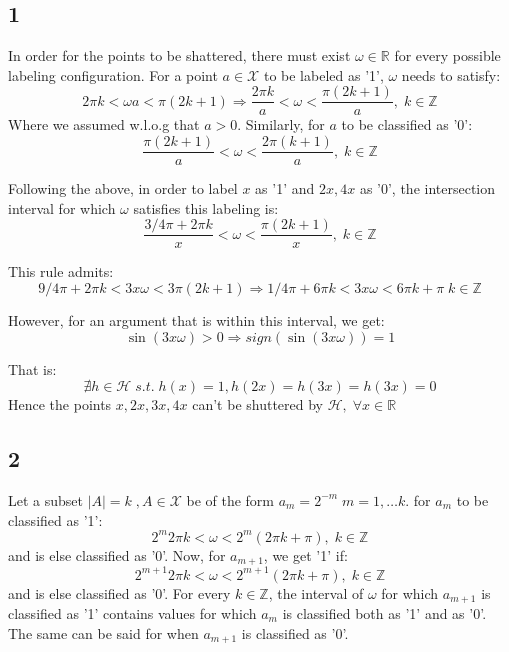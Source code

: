 \subsection*{1}
In order for the points to be shattered, there must exist $\omega \in \mathbb{R}$ for every possible labeling configuration.
For a point $a \in \mathcal{X}$ to be labeled as '1', $\omega$ needs to satisfy:
\begin{equation*}
    2 \pi k < \omega a < \pi (2k + 1) \Rightarrow \frac{2 \pi k}{a} < \omega < \frac{\pi (2k + 1)}{a},  \; k\in \mathbb{Z}
\end{equation*}
Where we assumed w.l.o.g that $a>0$. Similarly, for $a$ to be classified as '0':
\begin{equation*}
    \frac{\pi(2k+1)}{a} < \omega < \frac{2\pi(k + 1)}{a},  \; k\in \mathbb{Z}
\end{equation*}

Following the above, in order to label $x$ as '1' and $2x, 4x$ as '0', the intersection interval for which $\omega$ satisfies this labeling is:
\begin{equation*}
    \frac{3/4 \pi + 2 \pi k}{x} < \omega < \frac{\pi (2k + 1)}{x},  \; k\in \mathbb{Z}
\end{equation*}

This rule admits:
\begin{equation*}
    9/4 \pi + 2 \pi k < 3x \omega  < 3\pi (2k + 1) \Rightarrow
    1/4 \pi + 6 \pi k < 3x \omega  < 6\pi k + \pi \; k\in \mathbb{Z}
\end{equation*}

However, for an argument that is within this interval, we get:
\begin{equation*}
    \sin(3x\omega) > 0 \Rightarrow sign(\sin(3x\omega)) = 1
\end{equation*}

That is:
\begin{equation*}
    \nexists h\in \mathcal{H} \; s.t. \; h(x)=1, h(2x)=h(3x)=h(3x)=0
\end{equation*}
Hence the points $x, 2x, 3x, 4x$ can't be shuttered by $\mathcal{H}, \; \forall x\in \mathbb{R}$

\subsection*{2}
Let a subset $|A|=k \;, A\in \mathcal{X}$ be of the form $a_m = 2^{-m} \; m=1,\dotsc k$.
for $a_m$ to be classified as '1':
\begin{equation*}
   2^m 2\pi k < \omega < 2^m (2\pi k + \pi),  \; k\in \mathbb{Z}
\end{equation*}
and is else classified as '0'. Now, for $a_{m+1}$, we get '1' if:
\begin{equation*}
    2^{m+1} 2\pi k < \omega < 2^{m+1} (2\pi k + \pi),  \; k\in \mathbb{Z}
 \end{equation*}
and is else classified as '0'. For every $k\in \mathbb{Z}$, the interval of $\omega$ for which $a_{m+1}$ is classified as '1' contains values for which $a_m$ is classified both as '1' and as '0'. The same can be said for when $a_{m+1}$ is classified as '0'.

